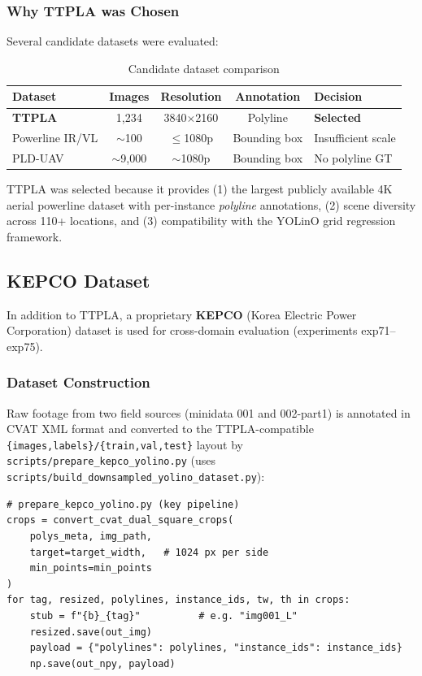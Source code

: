 \documentclass[11pt,a4paper]{article}
\begin{document}
\subsubsection{Why TTPLA was Chosen}
Several candidate datasets were evaluated:

\begin{table}[H]
\centering
\caption{Candidate dataset comparison}
\begin{tabular}{lcccl}
\toprule
Dataset & Images & Resolution & Annotation & Decision \\
\midrule
\textbf{TTPLA} & 1,234 & 3840$\times$2160 & Polyline & \textbf{Selected} \\
Powerline IR/VL & $\sim$100 & $\leq$1080p & Bounding box & Insufficient scale \\
PLD-UAV & $\sim$9,000 & $\sim$1080p & Bounding box & No polyline GT \\
\bottomrule
\end{tabular}
\end{table}

TTPLA was selected because it provides (1) the largest publicly available 4K aerial
powerline dataset with per-instance \emph{polyline} annotations, (2) scene diversity
across 110+ locations, and (3) compatibility with the YOLinO grid regression framework.

\subsection{KEPCO Dataset}
\label{subsec:kepco}

In addition to TTPLA, a proprietary \textbf{KEPCO} (Korea Electric Power Corporation)
dataset is used for cross-domain evaluation (experiments exp71--exp75).

\subsubsection{Dataset Construction}
Raw footage from two field sources (minidata 001 and 002-part1) is
annotated in CVAT XML format and converted to the TTPLA-compatible
\texttt{\{images,labels\}/\{train,val,test\}} layout by
\texttt{scripts/prepare\_kepco\_yolino.py}
(uses \texttt{scripts/build\_downsampled\_yolino\_dataset.py}):

\begin{lstlisting}
# prepare_kepco_yolino.py (key pipeline)
crops = convert_cvat_dual_square_crops(
    polys_meta, img_path,
    target=target_width,   # 1024 px per side
    min_points=min_points
)
for tag, resized, polylines, instance_ids, tw, th in crops:
    stub = f"{b}_{tag}"          # e.g. "img001_L"
    resized.save(out_img)
    payload = {"polylines": polylines, "instance_ids": instance_ids}
    np.save(out_npy, payload)
\end{lstlisting}
\end{document}
